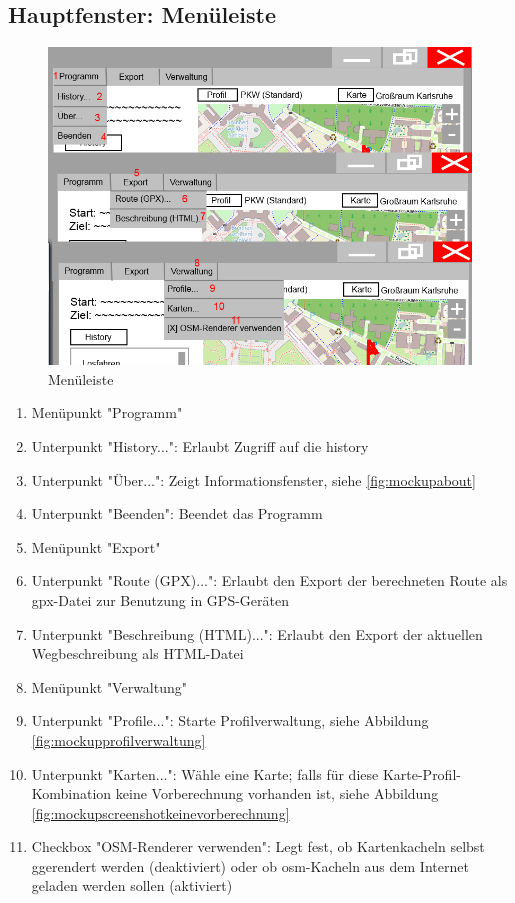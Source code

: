 \documentclass[a4paper, 11pt]{article}
\begin{document}
\subsection{Hauptfenster: Menüleiste}
\begin{figure}[H]
\centering
\includegraphics[width=0.7\linewidth]{mockup_screenshot_menu}
\caption{Menüleiste}
\label{fig:mockupscreenshotmenu}
\end{figure}
\begin{enumerate}
\item Menüpunkt "Programm"
\item Unterpunkt "History...": Erlaubt Zugriff auf die \gls{history}
\item Unterpunkt "Über...": Zeigt Informationsfenster, siehe \ref{fig:mockupabout} %
\item Unterpunkt "Beenden": Beendet das Programm
\item Menüpunkt "Export"
\item Unterpunkt "Route (GPX)...": Erlaubt den Export der berechneten Route als \gls{gpx}-Datei zur Benutzung in GPS-Geräten
\item Unterpunkt "Beschreibung (HTML)...": Erlaubt den Export der aktuellen Wegbeschreibung als HTML-Datei
\item Menüpunkt "Verwaltung"
\item Unterpunkt "Profile...": Starte Profilverwaltung, siehe Abbildung \ref{fig:mockupprofilverwaltung}
\item Unterpunkt "Karten...": Wähle eine Karte; falls für diese Karte-Profil-Kombination keine Vorberechnung vorhanden ist, siehe Abbildung \ref{fig:mockupscreenshotkeinevorberechnung}
\item Checkbox "OSM-Renderer verwenden": Legt fest, ob Kartenkacheln selbst ggerendert werden (deaktiviert) oder ob \gls{osm}-Kacheln aus dem Internet geladen werden sollen (aktiviert)
\end{enumerate}
\end{document}
